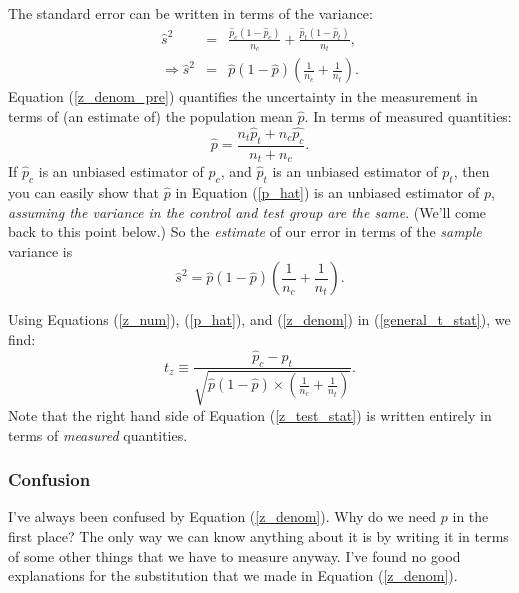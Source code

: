 \documentclass{article}
\numberwithin{equation}{section}
\begin{document}
The standard error can be written in terms of the variance:
\begin{eqnarray} \nonumber \label{z_denom_pre}
	\hat{s}^2 &=& \frac{\hat{p}_c(1-\hat{p}_c)}{n_c} + \frac{\hat{p}_t(1-\hat{p}_t)}{n_t}, \\ 
	\Rightarrow \hat{s}^2 &=& \hat{p}(1-\hat{p}) \left(\frac{1}{n_c} + \frac{1}{n_t}\right).
\end{eqnarray}
Equation (\ref{z_denom_pre}) quantifies the uncertainty in the measurement in terms of (an estimate of) the population mean $\hat{p}$. In terms of measured quantities:
\begin{equation} \label{p_hat}
	\hat{p} = \frac{n_t \hat{p}_t + n_c \hat{p_c}}{n_t + n_c}.
\end{equation}
If $\hat{p}_c$ is an unbiased estimator of $p_c$, and $\hat{p}_t$ is an unbiased estimator of $p_t$, then you can easily show that $\hat{p}$ in Equation (\ref{p_hat}) is an unbiased estimator of $p$, \textit{assuming the variance in the control and test group are the same}. (We'll come back to this point below.) So the \textit{estimate} of our error in terms of the \textit{sample} variance is
\begin{equation} \label{z_denom}
	\hat{s}^2 = \hat{p}(1-\hat{p}) \left(\frac{1}{n_c} + \frac{1}{n_t}\right).
\end{equation}

Using Equations (\ref{z_num}), (\ref{p_hat}), and (\ref{z_denom}) in (\ref{general_t_stat}), we find:
\begin{equation} \label{z_test_stat}
	t_z \equiv \frac{\hat{p}_c - \hat{p}_t}{\sqrt{\hat{p}\left(1-\hat{p}\right)\times\left(\frac{1}{n_c} + \frac{1}{n_t}\right)}}.
\end{equation}
Note that the right hand side of Equation (\ref{z_test_stat}) is written entirely in terms of \textit{measured} quantities.

\subsubsection{Confusion}

I've always been confused by Equation (\ref{z_denom}). Why do we need $p$ in the first place? The only way we can know anything about it is by writing it in terms of some other things that we have to measure anyway. I've found no good explanations for the substitution that we made in Equation (\ref{z_denom}). 
\end{document}
